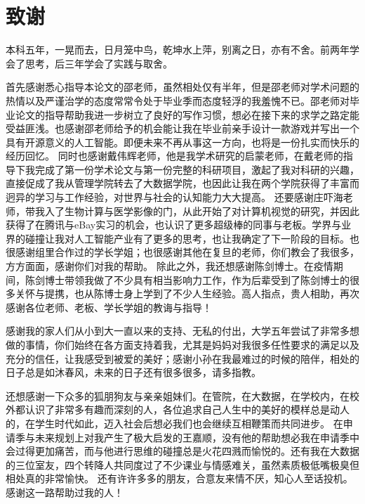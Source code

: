 \chapter*{致谢}
本科五年，一晃而去，日月笼中鸟，乾坤水上萍，别离之日，亦有不舍。前两年学会了思考，后三年学会了实践与取舍。

首先感谢悉心指导本论文的邵老师，虽然相处仅有半年，但是邵老师对学术问题的热情以及严谨治学的态度常常令处于毕业季而态度轻浮的我羞愧不已。邵老师对毕业论文的指导帮助我进一步树立了良好的写作习惯，想必在接下来的求学之路定能受益匪浅。也感谢邵老师给予的机会能让我在毕业前亲手设计一款游戏并写出一个具有开源意义的人工智能。即便未来不再从事这一方向，也将是一份扎实而快乐的经历回忆。
同时也感谢戴伟辉老师，他是我学术研究的启蒙老师，在戴老师的指导下我完成了第一份学术论文与第一份完整的科研项目，激起了我对科研的兴趣，直接促成了我从管理学院转去了大数据学院，也因此让我在两个学院获得了丰富而迥异的学习与工作经验，对世界与社会的认知能力大大提高。
还要感谢庄吓海老师，带我入了生物计算与医学影像的门，从此开始了对计算机视觉的研究，并因此获得了在腾讯与eBay实习的机会，也认识了更多超级棒的同事与老板。学界与业界的碰撞让我对人工智能产业有了更多的思考，也让我确定了下一阶段的目标。也很感谢组里合作过的学长学姐；也很感谢其他在复旦的老师，你们教会了我很多，方方面面，感谢你们对我的帮助。
除此之外，我还想感谢陈剑博士。在疫情期间，陈剑博士带领我做了不少具有相当影响力工作，作为后辈受到了陈剑博士的很多关怀与提携，也从陈博士身上学到了不少人生经验。高人指点，贵人相助，再次感谢各位老师、老板、学长学姐的教诲与指导！

感谢我的家人们从小到大一直以来的支持、无私的付出，大学五年尝试了非常多想做的事情，你们始终在各方面支持着我，尤其是妈妈对我很多任性要求的满足以及充分的信任，让我感受到被爱的美好；感谢小孙在我最难过的时候的陪伴，相处的日子总是如沐春风，未来的日子还有很多很多，请多指教。

还想感谢一下众多的狐朋狗友与亲亲姐妹们。在管院，在大数据，在学校内，在校外都认识了非常多有趣而深刻的人，各位追求自己人生中的美好的模样总是动人的，在学生时代如此，迈入社会后想必我们也会继续互相鞭策而共同进步。
在申请季与未来规划上对我产生了极大启发的王嘉顺，没有他的帮助想必我在申请季中会过得更加痛苦，而与他进行思维的碰撞总是火花四溅而愉悦的。还有我在大数据的三位室友，四个转降人共同度过了不少课业与情感难关，虽然素质极低嘴极臭但相处真的非常愉快。
还有许许多多的朋友，合意友来情不厌，知心人至话投机。感谢这一路帮助过我的人！
